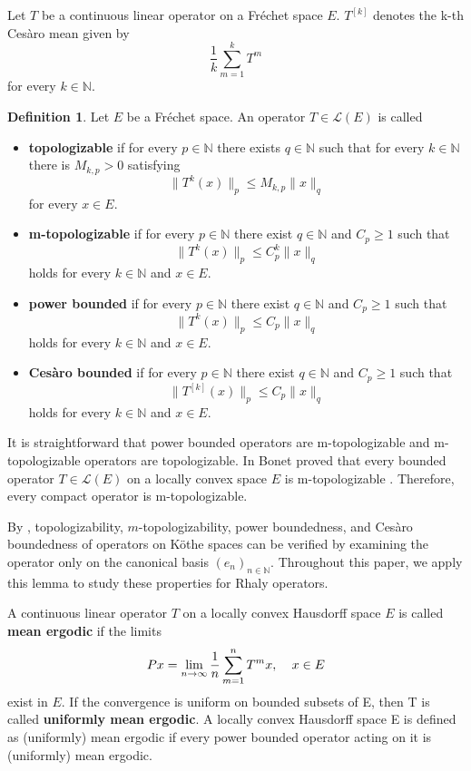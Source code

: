 \documentclass{birkjour}
\theoremstyle{definition}
\newtheorem{defn}[thm]{Definition}
\theoremstyle{remark}
\numberwithin{equation}{section}
\begin{document}
Let $T$ be a continuous linear operator on a Fr\'echet space $E$. $T^{[k]}$ denotes the k-th Ces\`{a}ro mean given by
 $$\frac{1}{k}\sum^{k}_{m=1} T^{m}$$
 for every $k\in \mathbb{N}$.
\begin{defn}\label{D1}Let $E$ be a Fr\'echet space. An operator $T\in \mathcal{L}(E)$ is called 
\begin{itemize}
\item \textbf{topologizable} if for every $p\in \mathbb{N}$ there exists $q\in \mathbb{N}$ such that for every $k\in \mathbb{N}$ there is $M_{k,p}>0$ satisfying
$$\|T^{k}(x)\|_{p}\leq M_{k,p}\|x\|_{q}$$
for every $x\in E$.
\item \textbf{m-topologizable} if for every $p\in \mathbb{N}$ there exist $q\in \mathbb{N}$ and $C_{p}\geq 1$ such that 
$$\|T^{k}(x)\|_{p}\leq C^{k}_{p}\|x\|_{q}$$
holds for every $k\in \mathbb{N}$ and $x\in E$.
\item \textbf{power bounded} if for every $p\in \mathbb{N}$ there exist $q\in \mathbb{N}$ and $C_{p}\geq 1$ such that
$$\|T^{k}(x)\|_{p}\leq C_{p}\|x\|_{q}$$
holds for every $k\in \mathbb{N}$ and $x\in E$.
\item \textbf{Ces\`{a}ro bounded }
if for every $p\in \mathbb{N}$ there exist $q\in \mathbb{N}$ and $C_{p}\geq 1$ such that 
$$\|T^{[k]}(x)\|_{p}\leq C_{p}\|x\|_{q}$$
holds for every $k\in \mathbb{N}$ and $x\in E$.
\end{itemize}
\end{defn}

It is straightforward that power bounded operators are m-topologizable and m-topologizable operators are topologizable.  In  \cite{B} Bonet proved that every bounded operator $T\in \mathcal{L}(E)$ on a locally convex space $E$ is m-topologizable \cite[Proposition 7]{B}. Therefore, every compact operator is m-topologizable.

By \cite[Lemma 2.5]{N3}, topologizability, $m$-topologizability, power 
boundedness, and Ces\`{a}ro boundedness of operators on Köthe spaces can be verified by examining the operator only on the canonical basis $(e_n)_{n\in \mathbb{N}}$. 
Throughout this paper, we apply this lemma to study these properties 
for Rhaly operators.

A continuous linear operator $T$ on a locally convex Hausdorff space $E$ is called \textbf{mean ergodic} if the limits
$$Px=\lim_{n\to \infty} \frac{1}{n}\sum^{n}_{m=1} T^{m}x, \hspace{0.15in} x\in E$$
exist in $E$. If the convergence is uniform on bounded subsets of E, then T is
called \textbf{uniformly mean ergodic}. A locally convex Hausdorff space E is defined as (uniformly) mean ergodic if every power bounded operator acting on it is (uniformly) mean ergodic. 
\end{document}

